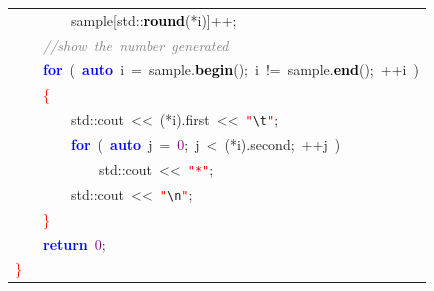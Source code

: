 \begin{small}
\begin{ttfamily}
\begin{center}
\begin{longtable}{|l|}
\mbox{}\ \ \ \ \ \ \ \ sample\textcolor{BrickRed}{[}std\textcolor{BrickRed}{::}\textbf{\textcolor{Black}{round}}\textcolor{BrickRed}{(*}i\textcolor{BrickRed}{)]++;} \\
\mbox{}\ \ \ \ \textit{\textcolor{Gray}{//show\ the\ number\ generated}} \\
\mbox{}\ \ \ \ \textbf{\textcolor{Blue}{for}}\ \textcolor{BrickRed}{(}\ \textbf{\textcolor{Blue}{auto}}\ i\ \textcolor{BrickRed}{=}\ sample\textcolor{BrickRed}{.}\textbf{\textcolor{Black}{begin}}\textcolor{BrickRed}{();}\ i\ \textcolor{BrickRed}{!=}\ sample\textcolor{BrickRed}{.}\textbf{\textcolor{Black}{end}}\textcolor{BrickRed}{();}\ \textcolor{BrickRed}{++}i\ \textcolor{BrickRed}{)} \\
\mbox{}\ \ \ \ \textcolor{Red}{\{} \\
\mbox{}\ \ \ \ \ \ \ \ std\textcolor{BrickRed}{::}cout\ \textcolor{BrickRed}{\textless{}\textless{}}\ \textcolor{BrickRed}{(*}i\textcolor{BrickRed}{).}first\ \textcolor{BrickRed}{\textless{}\textless{}}\ \texttt{\textcolor{Red}{"{}}}\texttt{\textcolor{CarnationPink}{\textbackslash{}t}}\texttt{\textcolor{Red}{"{}}}\textcolor{BrickRed}{;} \\
\mbox{}\ \ \ \ \ \ \ \ \textbf{\textcolor{Blue}{for}}\ \textcolor{BrickRed}{(}\ \textbf{\textcolor{Blue}{auto}}\ j\ \textcolor{BrickRed}{=}\ \textcolor{Purple}{0}\textcolor{BrickRed}{;}\ j\ \textcolor{BrickRed}{\textless{}}\ \textcolor{BrickRed}{(*}i\textcolor{BrickRed}{).}second\textcolor{BrickRed}{;}\ \textcolor{BrickRed}{++}j\ \textcolor{BrickRed}{)} \\
\mbox{}\ \ \ \ \ \ \ \ \ \ \ \ std\textcolor{BrickRed}{::}cout\ \textcolor{BrickRed}{\textless{}\textless{}}\ \texttt{\textcolor{Red}{"{}*"{}}}\textcolor{BrickRed}{;} \\
\mbox{}\ \ \ \ \ \ \ \ std\textcolor{BrickRed}{::}cout\ \textcolor{BrickRed}{\textless{}\textless{}}\ \texttt{\textcolor{Red}{"{}}}\texttt{\textcolor{CarnationPink}{\textbackslash{}n}}\texttt{\textcolor{Red}{"{}}}\textcolor{BrickRed}{;} \\
\mbox{}\ \ \ \ \textcolor{Red}{\}} \\
\mbox{}\ \ \ \ \textbf{\textcolor{Blue}{return}}\ \textcolor{Purple}{0}\textcolor{BrickRed}{;} \\
\mbox{}\textcolor{Red}{\}} \\
\hline
\end{longtable}
\end{center}

\end{ttfamily}
\end{small}

